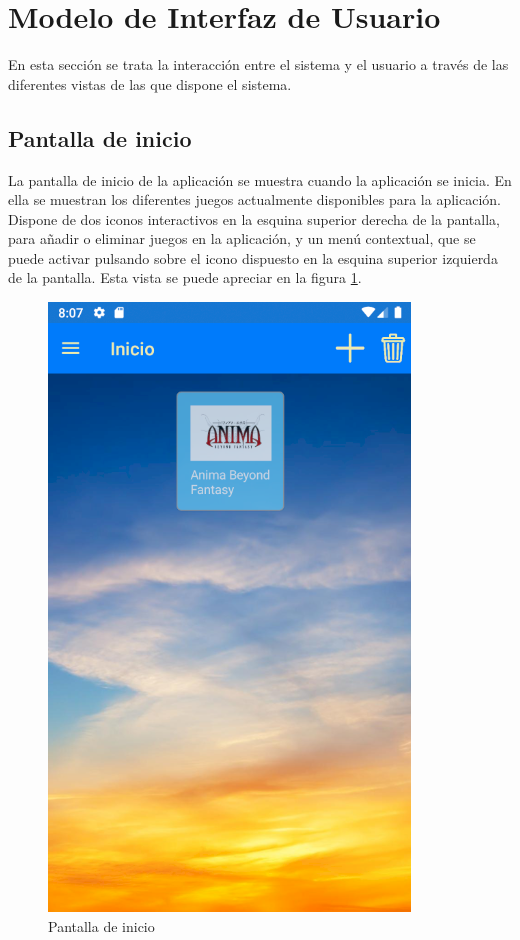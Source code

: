 
\section{Modelo de Interfaz de Usuario}
En esta sección se trata la interacción entre el sistema y el usuario a través de las diferentes vistas 
de las que dispone el sistema.

\subsection{Pantalla de inicio}
La pantalla de inicio de la aplicación se muestra cuando la aplicación se inicia. En ella se 
muestran los diferentes juegos actualmente disponibles para la aplicación.
Dispone de dos iconos interactivos en la esquina superior derecha de la pantalla, para añadir o eliminar 
juegos en la aplicación, y un menú contextual, que se puede activar pulsando sobre el icono dispuesto 
en la esquina superior izquierda de la pantalla. Esta vista se puede apreciar en la figura \ref*{PantallaInicio}.
\newpage

\begin{figure}[H]
    \centering
    \includegraphics[scale=0.7]{Figures/Capturas/PantallaInicio.png}
    \caption{Pantalla de inicio}
    \label{PantallaInicio}    
\end{figure}

